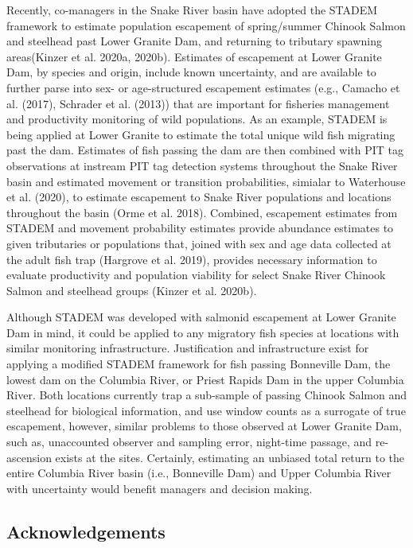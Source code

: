 \documentclass[
  12pt,
]{article}
\begin{document}
Recently, co-managers in the Snake River basin have adopted the STADEM framework to estimate population escapement of spring/summer Chinook Salmon and steelhead past Lower Granite Dam, and returning to tributary spawning areas(Kinzer et al. 2020a, 2020b). Estimates of escapement at Lower Granite Dam, by species and origin, include known uncertainty, and are available to further parse into sex- or age-structured escapement estimates (e.g., Camacho et al. (2017), Schrader et al. (2013)) that are important for fisheries management and productivity monitoring of wild populations. As an example, STADEM is being applied at Lower Granite to estimate the total unique wild fish migrating past the dam. Estimates of fish passing the dam are then combined with PIT tag observations at instream PIT tag detection systems throughout the Snake River basin and estimated movement or transition probabilities, simialar to Waterhouse et al. (2020), to estimate escapement to Snake River populations and locations throughout the basin (Orme et al. 2018). Combined, escapement estimates from STADEM and movement probability estimates provide abundance estimates to given tributaries or populations that, joined with sex and age data collected at the adult fish trap (Hargrove et al. 2019), provides necessary information to evaluate productivity and population viability for select Snake River Chinook Salmon and steelhead groups (Kinzer et al. 2020b).

Although STADEM was developed with salmonid escapement at Lower Granite Dam in mind, it could be applied to any migratory fish species at locations with similar monitoring infrastructure. Justification and infrastructure exist for applying a modified STADEM framework for fish passing Bonneville Dam, the lowest dam on the Columbia River, or Priest Rapids Dam in the upper Columbia River. Both locations currently trap a sub-sample of passing Chinook Salmon and steelhead for biological information, and use window counts as a surrogate of true escapement, however, similar problems to those observed at Lower Granite Dam, such as, unaccounted observer and sampling error, night-time passage, and re-ascension exists at the sites. Certainly, estimating an unbiased total return to the entire Columbia River basin (i.e., Bonneville Dam) and Upper Columbia River with uncertainty would benefit managers and decision making.

\hypertarget{acknowledgements}{%
\subsection{Acknowledgements}\label{acknowledgements}}
\end{document}
